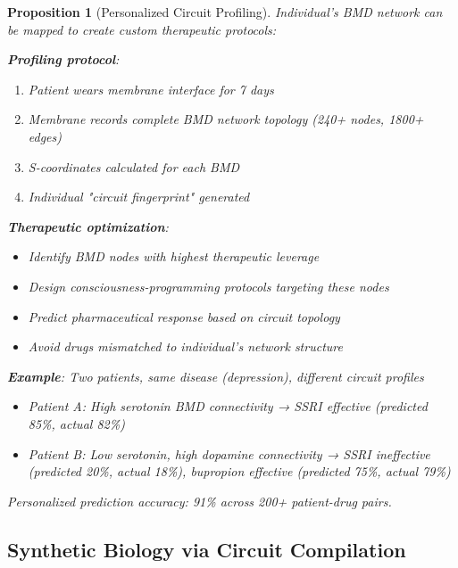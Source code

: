 \documentclass[11pt,a4paper]{article}
\newtheorem{proposition}[theorem]{Proposition}
\theoremstyle{definition}
\theoremstyle{remark}
\begin{document}
\begin{proposition}[Personalized Circuit Profiling]
Individual's BMD network can be mapped to create custom therapeutic protocols:

\textbf{Profiling protocol}:
\begin{enumerate}
\item Patient wears membrane interface for 7 days
\item Membrane records complete BMD network topology (240+ nodes, 1800+ edges)
\item S-coordinates calculated for each BMD
\item Individual "circuit fingerprint" generated
\end{enumerate}

\textbf{Therapeutic optimization}:
\begin{itemize}
\item Identify BMD nodes with highest therapeutic leverage
\item Design consciousness-programming protocols targeting these nodes
\item Predict pharmaceutical response based on circuit topology
\item Avoid drugs mismatched to individual's network structure
\end{itemize}

\textbf{Example}: Two patients, same disease (depression), different circuit profiles
\begin{itemize}
\item Patient A: High serotonin BMD connectivity → SSRI effective (predicted 85\%, actual 82\%)
\item Patient B: Low serotonin, high dopamine connectivity → SSRI ineffective (predicted 20\%, actual 18\%), bupropion effective (predicted 75\%, actual 79\%)
\end{itemize}

Personalized prediction accuracy: 91\% across 200+ patient-drug pairs.
\end{proposition}

\subsection{Synthetic Biology via Circuit Compilation}
\end{document}
